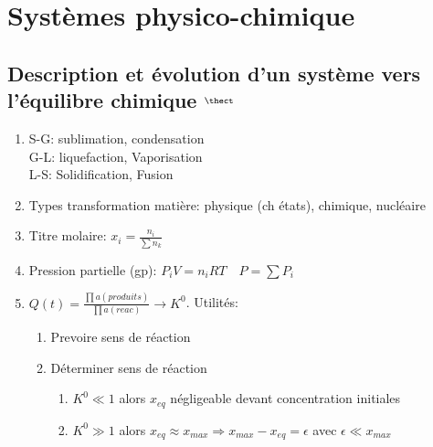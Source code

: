 \documentclass[fleqn]{article}
\theoremstyle{definition} \newtheorem*{defi}{D\'efinition}
\theoremstyle{definition} \newtheorem*{theo}{Th\'eor\`eme}
\theoremstyle{definition} \newtheorem*{coro}{Corollaire}
\theoremstyle{remark} \newtheorem*{rqs}{Remarques}
\theoremstyle{definition} \newtheorem*{prop}{Propri\'et\'e}
\begin{document}
\section{Syst\`emes physico-chimique}
\subsection{Description et \'evolution d'un syst\`eme vers l'\'equilibre chimique $^{\thect}$}
\begin{enumerate}
	\item S-G: sublimation, condensation\\
		G-L: liquefaction, Vaporisation\\
		L-S: Solidification, Fusion
	\item Types transformation mati\`ere: physique (ch \'etats), chimique, nucl\'eaire
	\item Titre molaire: $x_i = \frac{n_i}{\sum n_k}$
	\item Pression partielle (gp): $P_i V = n_i RT \quad P = \sum P_i$
	\item $Q(t) = \frac{\prod a(produits)}{\prod a(reac)} \rightarrow K^0$. Utilit\'es:
		\begin{enumerate}
			\item Prevoire sens de r\'eaction
			\item D\'eterminer sens de r\'eaction
				\begin{enumerate}
					\item $K^0 \ll 1$ alors $x_{eq}$ n\'egligeable devant concentration initiales
					\item $K^0 \gg 1$ alors $x_{eq} \approx x_{max} \Rightarrow x_{max} - x_{eq} = \epsilon$ avec $\epsilon \ll x_{max}$
				\end{enumerate}
		\end{enumerate}
\end{enumerate}
\end{document}
